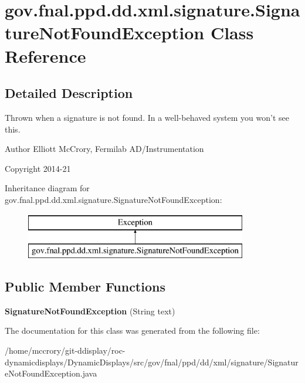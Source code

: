 \hypertarget{classgov_1_1fnal_1_1ppd_1_1dd_1_1xml_1_1signature_1_1SignatureNotFoundException}{\section{gov.\-fnal.\-ppd.\-dd.\-xml.\-signature.\-Signature\-Not\-Found\-Exception Class Reference}
\label{classgov_1_1fnal_1_1ppd_1_1dd_1_1xml_1_1signature_1_1SignatureNotFoundException}
}


\subsection{Detailed Description}
Thrown when a signature is not found. In a well-\/behaved system you won't see this.

\begin{DoxyAuthor}{Author}
Elliott Mc\-Crory, Fermilab A\-D/\-Instrumentation 
\end{DoxyAuthor}
\begin{DoxyCopyright}{Copyright}
2014-\/21 
\end{DoxyCopyright}
Inheritance diagram for gov.\-fnal.\-ppd.\-dd.\-xml.\-signature.\-Signature\-Not\-Found\-Exception\-:\begin{figure}[H]
\begin{center}
\leavevmode
\includegraphics[height=2.000000cm]{classgov_1_1fnal_1_1ppd_1_1dd_1_1xml_1_1signature_1_1SignatureNotFoundException}
\end{center}
\end{figure}
\subsection*{Public Member Functions}
\begin{DoxyCompactItemize}
\item 
\hypertarget{classgov_1_1fnal_1_1ppd_1_1dd_1_1xml_1_1signature_1_1SignatureNotFoundException_af80eae7d40d4d237e1f236753ce468e5}{{\bfseries Signature\-Not\-Found\-Exception} (String text)}\label{classgov_1_1fnal_1_1ppd_1_1dd_1_1xml_1_1signature_1_1SignatureNotFoundException_af80eae7d40d4d237e1f236753ce468e5}

\end{DoxyCompactItemize}


The documentation for this class was generated from the following file\-:\begin{DoxyCompactItemize}
\item 
/home/mccrory/git-\/ddisplay/roc-\/dynamicdisplays/\-Dynamic\-Displays/src/gov/fnal/ppd/dd/xml/signature/Signature\-Not\-Found\-Exception.\-java\end{DoxyCompactItemize}
